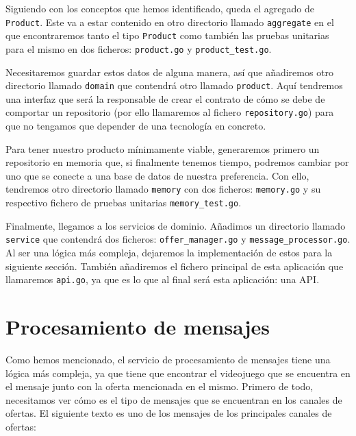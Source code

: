 Siguiendo con los conceptos que hemos identificado, queda el agregado de 
\verb|Product|. Este va a estar contenido en otro directorio llamado 
\verb|aggregate| en el que encontraremos tanto el tipo \verb|Product| como también 
las pruebas unitarias para el mismo en dos ficheros: \verb|product.go| y 
\verb|product_test.go|.

Necesitaremos guardar estos datos de alguna manera, así que añadiremos otro 
directorio llamado \verb|domain| que contendrá otro llamado \verb|product|. Aquí 
tendremos una interfaz que será la responsable de crear el contrato de cómo se debe 
de comportar un repositorio (por ello llamaremos al fichero \verb|repository.go|) 
para que no tengamos que depender de una tecnología en concreto. 

Para tener nuestro producto mínimamente viable, generaremos primero un repositorio 
en memoria que, si finalmente tenemos tiempo, podremos cambiar por uno que se 
conecte a una base de datos de nuestra preferencia. Con ello, tendremos otro  
directorio llamado \verb|memory| con dos ficheros: \verb|memory.go| y su respectivo 
fichero de pruebas unitarias \verb|memory_test.go|.

Finalmente, llegamos a los servicios de dominio. Añadimos un directorio llamado 
\verb|service| que contendrá dos ficheros: \verb|offer_manager.go| y 
\verb|message_processor.go|. Al ser una lógica más compleja, dejaremos la 
implementación de estos para la siguiente sección. También añadiremos el fichero 
principal de esta aplicación que llamaremos \verb|api.go|, ya que es lo que al 
final será esta aplicación: una API.

\section{Procesamiento de mensajes}

Como hemos mencionado, el servicio de procesamiento de mensajes tiene una lógica 
más compleja, ya que tiene que encontrar el videojuego que se encuentra en el 
mensaje junto con la oferta mencionada en el mismo. Primero de todo, necesitamos 
ver cómo es el tipo de mensajes que se encuentran en los canales de ofertas. El 
siguiente texto es uno de los mensajes de los principales canales de ofertas:

